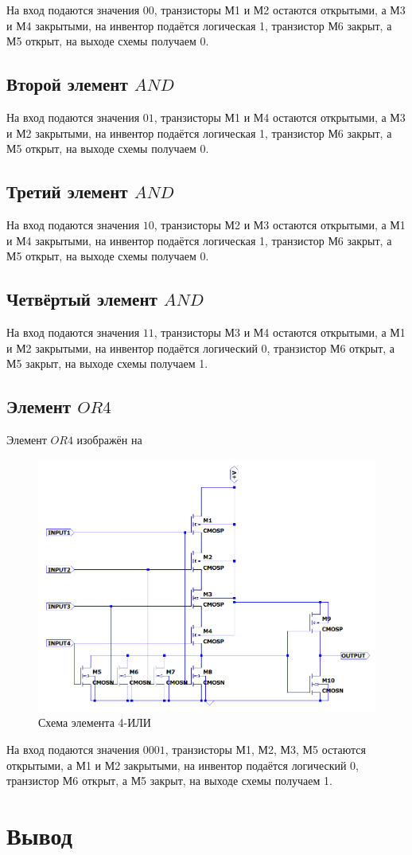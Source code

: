 \documentclass[a4paper,14pt]{article}
\begin{document}
	На вход подаются значения $00$, транзисторы М1 и М2 остаются открытыми, а М3 и М4 закрытыми, на инвентор подаётся логическая 1, транзистор М6 закрыт, а М5 открыт, на выходе схемы получаем 0.

	\subsection{Второй элемент $AND$}

	На вход подаются значения $01$, транзисторы М1 и М4 остаются открытыми, а М3 и М2 закрытыми, на инвентор подаётся логическая 1, транзистор М6 закрыт, а М5 открыт, на выходе схемы получаем 0.
	
	\subsection{Третий элемент $AND$}
	
	На вход подаются значения $10$, транзисторы М2 и М3 остаются открытыми, а М1 и М4 закрытыми, на инвентор подаётся логическая 1, транзистор М6 закрыт, а М5 открыт, на выходе схемы получаем 0.

	\subsection{Четвёртый элемент $AND$}

	На вход подаются значения $11$, транзисторы М3 и М4 остаются открытыми, а М1 и М2 закрытыми, на инвентор подаётся логический 0, транзистор М6 открыт, а М5 закрыт, на выходе схемы получаем 1.
	
	\subsection{Элемент $OR4$}
	
	Элемент $OR4$ изображён на 
	
	\begin{figure}[H]
		\centering		
		\includegraphics[width=\linewidth]{image/schema_or}
		\caption{Схема элемента 4-ИЛИ}\label{img:schema_or}
	\end{figure}

	На вход подаются значения $0001$, транзисторы М1, М2, М3, М5 остаются открытыми, а М1 и М2 закрытыми, на инвентор подаётся логический 0, транзистор М6 открыт, а М5 закрыт, на выходе схемы получаем 1.
	
\section{Вывод}
\end{document}
